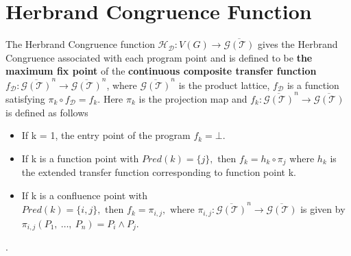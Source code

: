 \section{Herbrand Congruence Function}
\label{sec:HerbrandCongruenceFunction}
The Herbrand Congruence function 
$\mathcal H_{\mathcal D} : V(G) \to \overline{\mathcal G(\mathcal T)}$ 
gives the Herbrand Congruence associated with each program point and 
is defined to be \textbf{the maximum fix point} of the \textbf{continuous
composite transfer function} 
$f_{\mathcal D} : \overline{\mathcal G(\mathcal T)}^n \to \overline{\mathcal G(\mathcal T)}^n$, 
where $\overline{\mathcal G(\mathcal T)}^n$ is the product lattice, 
$f_{\mathcal D}$ is a function satisfying $\pi_k \circ f_{\mathcal D} = f_k$. Here $\pi_k$ is the projection map
and $f_k : \overline{\mathcal G(\mathcal T)}^n \to \overline{\mathcal G(\mathcal T)}$ 
is defined as follows 
\begin{itemize}
    \item   If k = 1, the entry point of the program $f_k = \bot$.
    \item   If k is a function point with $Pred(k) = \{j\}, \text{ then } f_k = h_k \circ \pi_j$ where 
    $h_k$ is the extended transfer function corresponding to function point k.
    \item   If k is a confluence point with 
    $Pred(k) = \{i, j\}, \text{ then } f_k = \pi_{i, j}, \text{ where } \pi_{i, j}:\overline{\mathcal G(\mathcal T)}^n \to \overline{\mathcal G(\mathcal T)}$ 
    is given by $\pi_{i,j}(P_1,\ \dots,\ P_n) = P_i \land P_j$.
\end{itemize}.